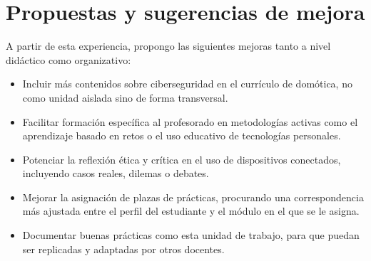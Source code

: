 \section{Propuestas y sugerencias de mejora}

A partir de esta experiencia, propongo las siguientes mejoras tanto a nivel didáctico como organizativo:

\begin{itemize}
  \item Incluir más contenidos sobre ciberseguridad en el currículo de domótica, no como unidad aislada sino de forma transversal.
  \item Facilitar formación específica al profesorado en metodologías activas como el aprendizaje basado en retos o el uso educativo de tecnologías personales.
  \item Potenciar la reflexión ética y crítica en el uso de dispositivos conectados, incluyendo casos reales, dilemas o debates.
  \item Mejorar la asignación de plazas de prácticas, procurando una correspondencia más ajustada entre el perfil del estudiante y el módulo en el que se le asigna.
  \item Documentar buenas prácticas como esta unidad de trabajo, para que puedan ser replicadas y adaptadas por otros docentes.
\end{itemize}
